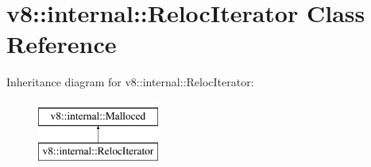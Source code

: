 \hypertarget{classv8_1_1internal_1_1RelocIterator}{}\section{v8\+:\+:internal\+:\+:Reloc\+Iterator Class Reference}
\label{classv8_1_1internal_1_1RelocIterator}
Inheritance diagram for v8\+:\+:internal\+:\+:Reloc\+Iterator\+:\begin{figure}[H]
\begin{center}
\leavevmode
\includegraphics[height=2.000000cm]{classv8_1_1internal_1_1RelocIterator}
\end{center}
\end{figure}
